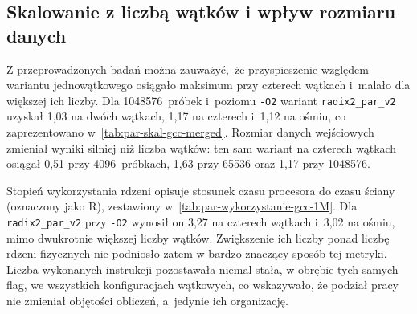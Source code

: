 \subsection{Skalowanie z liczbą wątków i wpływ rozmiaru danych}
Z przeprowadzonych badań można zauważyć, że przyspieszenie względem wariantu jednowątkowego osiągało maksimum przy czterech wątkach
 i~malało dla większej ich liczby.  Dla 1048576~próbek i~poziomu \texttt{-O2} wariant
\texttt{radix2\_par\_v2} uzyskał 1,03 na dwóch wątkach, 1,17 na czterech
i~1,12 na ośmiu, co zaprezentowano w~\cref{tab:par-skal-gcc-merged}. 
Rozmiar danych wejściowych zmieniał wyniki silniej niż liczba wątków: ten sam wariant na czterech wątkach
osiągał 0,51 przy 4096~próbkach, 1,63 przy 65536 oraz 1,17 przy 1048576. 

Stopień wykorzystania rdzeni opisuje stosunek czasu procesora do czasu ściany (oznaczony jako R),
zestawiony w~\cref{tab:par-wykorzystanie-gcc-1M}. Dla \texttt{radix2\_par\_v2}
przy \texttt{-O2} wynosił on 3,27 na czterech wątkach i~3,02 na ośmiu, mimo
dwukrotnie większej liczby wątków. Zwiększenie ich liczby ponad liczbę rdzeni
fizycznych nie podniosło zatem w bardzo znaczący sposób tej metryki. Liczba wykonanych
instrukcji pozostawała niemal stała, w obrębie tych samych flag, we wszystkich konfiguracjach
wątkowych, co wskazywało, że podział pracy nie zmieniał objętości obliczeń,
a~jedynie  ich organizację.
